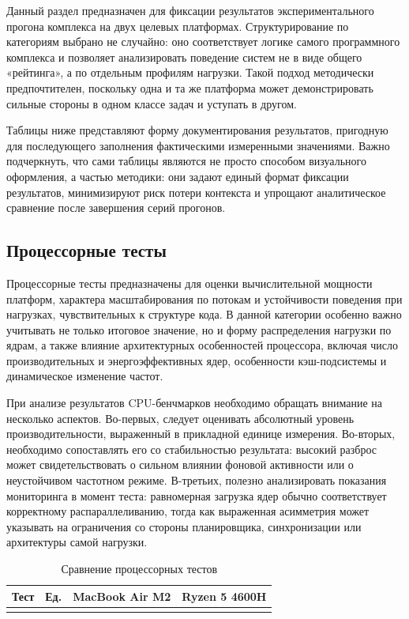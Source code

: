 Данный раздел предназначен для фиксации результатов экспериментального прогона комплекса на двух целевых платформах. Структурирование по категориям выбрано не случайно: оно соответствует логике самого программного комплекса и позволяет анализировать поведение систем не в виде общего «рейтинга», а по отдельным профилям нагрузки. Такой подход методически предпочтителен, поскольку одна и та же платформа может демонстрировать сильные стороны в одном классе задач и уступать в другом.

Таблицы ниже представляют форму документирования результатов, пригодную для последующего заполнения фактическими измеренными значениями. Важно подчеркнуть, что сами таблицы являются не просто способом визуального оформления, а частью методики: они задают единый формат фиксации результатов, минимизируют риск потери контекста и упрощают аналитическое сравнение после завершения серий прогонов.

\subsection{Процессорные тесты}

Процессорные тесты предназначены для оценки вычислительной мощности платформ, характера масштабирования по потокам и устойчивости поведения при нагрузках, чувствительных к структуре кода. В данной категории особенно важно учитывать не только итоговое значение, но и форму распределения нагрузки по ядрам, а также влияние архитектурных особенностей процессора, включая число производительных и энергоэффективных ядер, особенности кэш-подсистемы и динамическое изменение частот.

При анализе результатов CPU-бенчмарков необходимо обращать внимание на несколько аспектов. Во-первых, следует оценивать абсолютный уровень производительности, выраженный в прикладной единице измерения. Во-вторых, необходимо сопоставлять его со стабильностью результата: высокий разброс может свидетельствовать о сильном влиянии фоновой активности или о неустойчивом частотном режиме. В-третьих, полезно анализировать показания мониторинга в момент теста: равномерная загрузка ядер обычно соответствует корректному распараллеливанию, тогда как выраженная асимметрия может указывать на ограничения со стороны планировщика, синхронизации или архитектуры самой нагрузки.

\begin{table}[!htbp]
\centering
\caption{Сравнение процессорных тестов}
\label{tab:cpu_compare}
\begin{tabular}{|l|c|c|c|}
\hline
\textbf{Тест} & \textbf{Ед.} & \textbf{MacBook Air M2} & \textbf{Ryzen 5 4600H} \\
\hline
 &  &  &  \\
\hline
\end{tabular}
\end{table}

